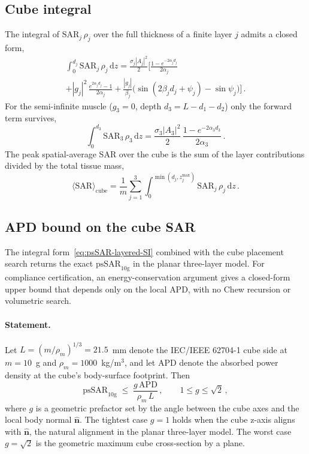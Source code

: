 \documentclass[journal,twocolumn,10pt]{IEEEtran}
\theoremstyle{plain}
\theoremstyle{remark}
\newcommand{\nhat}{\hat{\bm{n}}}
\newcommand{\APD}{\mathrm{APD}}
\newcommand{\diff}{\mathrm{d}}
\begin{document}
\subsection{Cube integral}
The integral of $\mathrm{SAR}_j\,\rho_j$ over the full thickness of
a finite layer $j$ admits a closed form,
\begin{multline}\label{eq:layer-integral-SI}
  \int_0^{d_j}\mathrm{SAR}_j\,\rho_j\,\diff z
  = \frac{\sigma_j |A_j|^2}{2}\biggl[
    \frac{1 - e^{-2\alpha_j d_j}}{2\alpha_j}\\
  + |g_j|^2\,\frac{e^{2\alpha_j d_j} - 1}{2\alpha_j}
  + \frac{|g_j|}{\beta_j}\bigl(\sin(2\beta_j d_j + \psi_j)
    - \sin\psi_j\bigr)
  \biggr]\, .
\end{multline}
For the semi-infinite muscle ($g_3 = 0$, depth $d_3 = L - d_1 -
d_2$) only the forward term survives,
\begin{equation}\label{eq:muscle-integral-SI}
  \int_0^{d_3}\mathrm{SAR}_3\,\rho_3\,\diff z
  = \frac{\sigma_3 |A_3|^2}{2}\,
  \frac{1 - e^{-2\alpha_3 d_3}}{2\alpha_3}\, .
\end{equation}
The peak spatial-average SAR over the cube is the sum of the layer
contributions divided by the total tissue mass,
\begin{equation}\label{eq:psSAR-layered-SI}
  \langle\mathrm{SAR}\rangle_{\mathrm{cube}}
  = \frac{1}{m}\sum_{j=1}^{3}\int_0^{\min(d_j, z_j^{\max})}
    \mathrm{SAR}_j\,\rho_j\,\diff z\, .
\end{equation}

\subsection{APD bound on the cube SAR}\label{si:apd-bound}

The integral form~\eqref{eq:psSAR-layered-SI} combined with the cube
placement search returns the exact $\mathrm{psSAR}_{10\mathrm{g}}$ in
the planar three-layer model. For compliance certification, an
energy-conservation argument gives a closed-form upper bound that
depends only on the local \gls{APD}, with no Chew recursion or
volumetric search.

\paragraph{Statement.}
Let $L = (m/\rho_m)^{1/3} = 21.5$~mm denote the IEC/IEEE 62704-1 cube
side at $m = 10$~g and $\rho_m = 1000$~kg/m$^3$, and let $\APD$ denote
the absorbed power density at the cube's body-surface footprint. Then
\begin{equation}\label{eq:apd-bound-SI}
  \mathrm{psSAR}_{10\mathrm{g}} \;\le\; \frac{g\,\APD}{\rho_m\,L}\, ,
  \qquad 1 \le g \le \sqrt{2}\, ,
\end{equation}
where $g$ is a geometric prefactor set by the angle between the cube
axes and the local body normal $\nhat$. The tightest case $g = 1$
holds when the cube z-axis aligns with $\nhat$, the natural alignment
in the planar three-layer model. The worst case $g = \sqrt{2}$ is the
geometric maximum cube cross-section by a plane.
\end{document}
